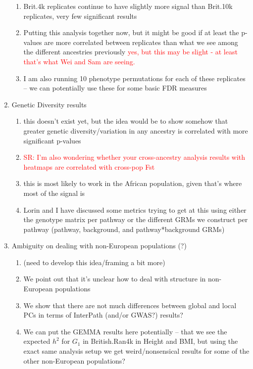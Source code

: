 \documentclass[12pt, a4paper]{article}
\newcommand{\red}[1]{\textcolor{red}{#1}}
\begin{document}
\begin{enumerate}
\begin{enumerate}
        \item Brit.4k replicates continue to have slightly more signal than Brit.10k replicates, very few significant results
        \item Putting this analysis together now, but it might be good if at least the p-values are more correlated between replicates than what we see among the different ancestries previously \red{yes, but this may be slight - at least that's what Wei and Sam are seeing.}
        \item I am also running 10 phenotype permutations for each of these replicates -- we can potentially use these for some basic FDR measures
    \end{enumerate}
    \item Genetic Diversity results
    \begin{enumerate}
        \item this doesn't exist yet, but the idea would be to show somehow that greater genetic diversity/variation in any ancestry is correlated with more significant p-values
        \item \red{SR: I'm also wondering whether your cross-ancestry analysis results with heatmaps are correlated with cross-pop Fst}
        \item this is most likely to work in the African population, given that's where most of the signal is
        \item Lorin and I have discussed some metrics trying to get at this using either the genotype matrix per pathway or the different GRMs we construct per pathway (pathway, background, and pathway*background GRMs)
    \end{enumerate}
    \item Ambiguity on dealing with non-European populations (?)
    \begin{enumerate}
        \item (need to develop this idea/framing a bit more)
        \item We point out that it's unclear how to deal with structure in non-European populations
        \item We show that there are not much differences between global and local PCs in terms of InterPath (and/or GWAS?) results?
        \item We can put the GEMMA results here potentially -- that we see the expected $h^{2}$ for $G_1$ in British.Ran4k in Height and BMI, but using the exact same analysis setup we get weird/nonsensical results for some of the other non-European populations?
    \end{enumerate}
    
\end{enumerate}

\fi
\end{document}
